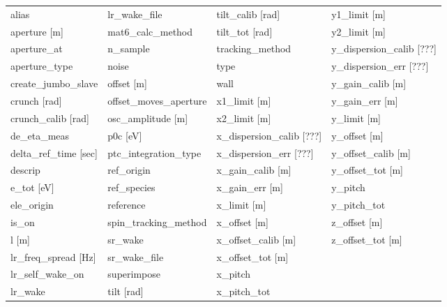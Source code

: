  \begin{tabular}{llll} \toprule
alias                            & lr_wake_file                     & tilt_calib [rad]                 & y1_limit [m]                     \\
aperture [m]                     & mat6_calc_method                 & tilt_tot [rad]                   & y2_limit [m]                     \\
aperture_at                      & n_sample                         & tracking_method                  & y_dispersion_calib [???]         \\
aperture_type                    & noise                            & type                             & y_dispersion_err [???]           \\
create_jumbo_slave               & offset [m]                       & wall                             & y_gain_calib [m]                 \\
crunch [rad]                     & offset_moves_aperture            & x1_limit [m]                     & y_gain_err [m]                   \\
crunch_calib [rad]               & osc_amplitude [m]                & x2_limit [m]                     & y_limit [m]                      \\
de_eta_meas                      & p0c [eV]                         & x_dispersion_calib [???]         & y_offset [m]                     \\
delta_ref_time [sec]             & ptc_integration_type             & x_dispersion_err [???]           & y_offset_calib [m]               \\
descrip                          & ref_origin                       & x_gain_calib [m]                 & y_offset_tot [m]                 \\
e_tot [eV]                       & ref_species                      & x_gain_err [m]                   & y_pitch                          \\
ele_origin                       & reference                        & x_limit [m]                      & y_pitch_tot                      \\
is_on                            & spin_tracking_method             & x_offset [m]                     & z_offset [m]                     \\
l [m]                            & sr_wake                          & x_offset_calib [m]               & z_offset_tot [m]                 \\
lr_freq_spread [Hz]              & sr_wake_file                     & x_offset_tot [m]                 &                                  \\
lr_self_wake_on                  & superimpose                      & x_pitch                          &                                  \\
lr_wake                          & tilt [rad]                       & x_pitch_tot                      &                                  \\
 \bottomrule
 \end{tabular}
 \vfill
 
